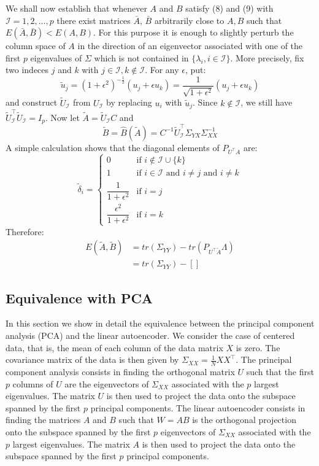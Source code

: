 We shall now establish that whenever $A$ and $B$ satisfy (8) and (9) with $\mathcal{I} = {1,  2, \dots, p}$ there exist matrices $\bar{A}$, $\bar{B}$ arbitrarily close to $A,B$ such that $E(\bar{A},\bar{B}) < E(A,B)$. For this purpose it is enough to slightly perturb the column space of $A$ in the direction of an eigenvector associated with one of the first $p$ eigenvalues of $\Sigma$ which is not contained in $\{\lambda_i, i \in \mathcal{I}\}$. More precisely, fix two indeces $j$ and $k$ with $j \in \mathcal{I}, k \not\in \mathcal{I}$. For any $\epsilon$, put:
\[
    \tilde{u}_j = (1+\epsilon^2)^{-\frac{1}{2}}(u_j + \epsilon u_k) = \dfrac{1}{\sqrt{1+\epsilon^2}}(u_j + \epsilon u_k) 
\]
and construct $\tilde{U}_\mathcal{I}$ from $U_\mathcal{I}$ by replacing $u_i$ with $\tilde{u}_j$. Since $k \not\in \mathcal{I}$, we still have $\tilde{U}^\intercal_\mathcal{I} \tilde{U}_\mathcal{I} = I_p$. Now let $\tilde{A} = \tilde{U}_\mathcal{I} C$ and
\[
    \tilde{B} = \hat{B}(\tilde{A}) = C^{-1}\tilde{U}^\intercal_\mathcal{I} \Sigma_{YX}\Sigma_{XX}^{-1}    
\]
A simple calculation shows that the diagonal elements of $P_{U^\intercal A}$ are:
\[
    \tilde{\delta}_i = 
    \begin{cases}
        0 & \text{if } i \not \in \mathcal{I} \cup \{k\}\\
        1 & \text{if } i \in \mathcal{I} \text{ and } i \neq j \text{ and } i \neq k\\
        \dfrac{1}{1+\epsilon^2} & \text{if } i = j\\
        \dfrac{\epsilon^2}{1 + \epsilon^2} &\text{if } i = k
    \end{cases}    
\]
Therefore:
\[
    \begin{split}
        E(\tilde{A},\tilde{B}) &= tr(\Sigma_{YY}) - tr(P_{U^\intercal \tilde{A}}\Lambda)\\
        &= tr(\Sigma_{YY}) - \left[\right]
    \end{split}    
\]

\subsection{Equivalence with PCA}
In this section we show in detail the equivalence between the principal component analysis (PCA) and the linear autoencoder. We consider the case of centered data, that is, the mean of each column of the data matrix $X$ is zero. The covariance matrix of the data is then given by $\Sigma_{XX} = \frac{1}{N}XX^\intercal$. The principal component analysis consists in finding the orthogonal matrix $U$ such that the first $p$ columns of $U$ are the eigenvectors of $\Sigma_{XX}$ associated with the $p$ largest eigenvalues. The matrix $U$ is then used to project the data onto the subspace spanned by the first $p$ principal components. The linear autoencoder consists in finding the matrices $A$ and $B$ such that $W = AB$ is the orthogonal projection onto the subspace spanned by the first $p$ eigenvectors of $\Sigma_{XX}$ associated with the $p$ largest eigenvalues. The matrix $A$ is then used to project the data onto the subspace spanned by the first $p$ principal components.


